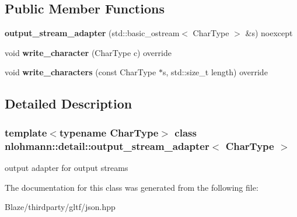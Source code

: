\subsection*{Public Member Functions}
\begin{DoxyCompactItemize}
\item 
\mbox{\label{classnlohmann_1_1detail_1_1output__stream__adapter_ae44ed343cb1a716248547f48dd045b6a}} 
{\bfseries output\+\_\+stream\+\_\+adapter} (std\+::basic\+\_\+ostream$<$ Char\+Type $>$ \&s) noexcept
\item 
\mbox{\label{classnlohmann_1_1detail_1_1output__stream__adapter_a6e2698c76b200b2d8fac6cebfc43a245}} 
void {\bfseries write\+\_\+character} (Char\+Type c) override
\item 
\mbox{\label{classnlohmann_1_1detail_1_1output__stream__adapter_ad61375497a7d03cb0bdcddfdaad185d0}} 
void {\bfseries write\+\_\+characters} (const Char\+Type $\ast$s, std\+::size\+\_\+t length) override
\end{DoxyCompactItemize}


\subsection{Detailed Description}
\subsubsection*{template$<$typename Char\+Type$>$\newline
class nlohmann\+::detail\+::output\+\_\+stream\+\_\+adapter$<$ Char\+Type $>$}

output adapter for output streams 

The documentation for this class was generated from the following file\+:\begin{DoxyCompactItemize}
\item 
Blaze/thirdparty/gltf/json.\+hpp\end{DoxyCompactItemize}
